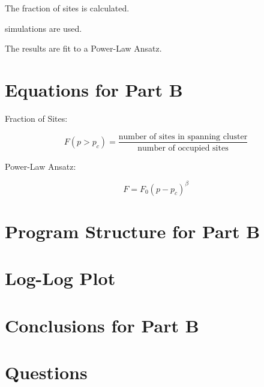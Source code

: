 \documentclass[12pt]{article}
\begin{document}
\noindent The fraction of sites is calculated. \newline

 simulations are used. \newline

\noindent The results are fit to a Power-Law Ansatz.

\section{Equations for Part B}

\noindent Fraction of Sites:

\begin{equation}
F(p>p_c)=\frac{\text{number of sites in spanning cluster}}{\text{number of occupied sites}}
\end{equation}

\noindent Power-Law Ansatz:

\begin{equation}
F=F_0(p-p_c)^\beta
\end{equation}

\section{Program Structure for Part B}

\section{Log-Log Plot}

\section{Conclusions for Part B}

\section{Questions}
\end{document}
